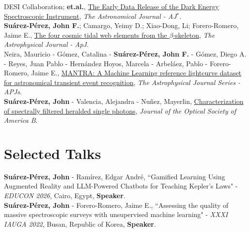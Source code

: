 \documentclass[10pt, a4paper]{article}
\newcommand{\years}[1]{\marginnote{\scriptsize #1}}
\begin{document}
\years{2024}DESI Collaboration; \textbf{et.al.}, \href{https://arxiv.org/abs/2306.06308}{The Early Data Release of the Dark Energy Spectroscopic Instrument}, \emph{The Astronomical Journal - AJ}$^{*}$.
\\

\years{2021}\textbf{Suárez-Pérez, John F.}; Camargo, Yeimy D.; Xiao-Dong, Li; Forero-Romero, 
Jaime E., \href{https://iopscience.iop.org/article/10.3847/1538-4357/ac1fed/pdf}{The four cosmic tidal web elements from the $\beta$-skeleton}, \emph{The Astrophysical Journal - ApJ}. 
\\

\years{2020}Neira, Mauricio - Gómez, Catalina - \textbf{Suárez-Pérez, John F.} - Gómez, Diego A. - Reyes, Juan Pablo - Hernández Hoyos, Marcela - Arbeláez, Pablo - Forero-Romero, Jaime E., \href{https://iopscience.iop.org/article/10.3847/1538-4365/aba267/pdf}{MANTRA: A Machine Learning reference lightcurve dataset for astronomical transient event recognition}, \emph{The Astrophysical Journal Series - APJs}.
\\

\years{2020}\textbf{Suárez-Pérez, John} - Valencia, Alejandra - Nuñez, Mayerlin, \href{https://doi.org/10.1364/JOSAB.387118}{Characterization of spectrally filtered heralded single photons}, \emph{Journal of the Optical Society of America B}.




\section*{Selected Talks}
\noindent

\years{2026}\textbf{Suárez-Pérez, John} - Ramírez, Edgar André, “Gamified Learning Using Augmented Reality and LLM-Powered Chatbots for Teaching Kepler's Laws" - \emph{EDUCON 2026},  Cairo, Egypt, \textbf{Speaker}.\\

\years{2022}\textbf{Suárez-Pérez, John} - Forero-Romero, Jaime E., “Assessing the quality of massive spectroscopic surveys with unsupervised machine learning" - \emph{XXXI IAUGA 2022},  Busan, Republic of Korea, \textbf{Speaker}.\\
\end{document}
